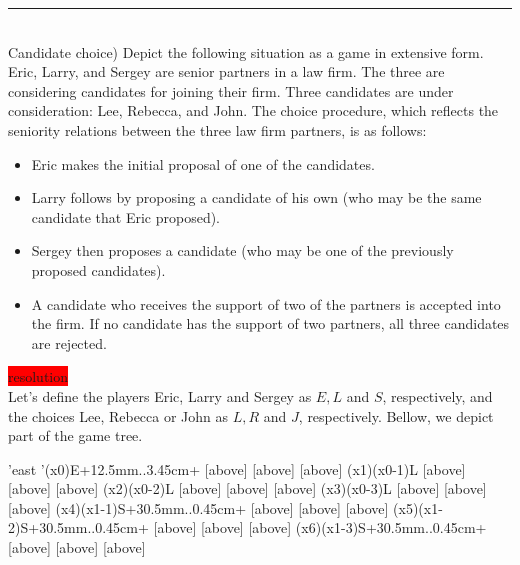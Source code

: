 \documentclass[10pt]{report}
\newenvironment{exercise}[1]
    {\vspace{0.5cm}\hrule\vspace{0.5cm}\noindent\fbox{#1}\\}
    {\vspace{0.5cm}}
\newenvironment{response}
{\vspace{0.2cm}\noindent\colorbox{red}{resolution}}
    {\vspace{0.5cm}}
\begin{document}
\begin{exercise}{3.2}
	(Candidate choice) Depict the following situation as a game in extensive form. Eric, Larry, and Sergey are senior partners in a law firm. The three are considering candidates for joining their firm. Three candidates are under consideration: Lee, Rebecca, and John. The choice procedure, which reflects the seniority relations between the three law firm partners, is as follows:
	\begin{itemize}
		\item Eric makes the initial proposal of one of the candidates.
		\item Larry follows by proposing a candidate of his own (who may be the same candidate that Eric proposed).
		\item Sergey then proposes a candidate (who may be one of the previously proposed candidates).
		\item A candidate who receives the support of two of the partners is accepted into the firm. If no candidate has the support of two partners, all three candidates are rejected.
	\end{itemize}
	\begin{response}\\
		Let's define the players Eric, Larry and Sergey as $ E, L $ and $ S $, respectively, and the choices Lee, Rebecca or John as $ L,R $ and $ J $, respectively. Bellow, we depict part of the game tree.\\
		\vspace{0.5cm}

		\begin{istgame}[sloped,font=\tiny]
			\setistgrowdirection'{east}
			\setistOvalNodeStyle{.6cm}
			\istrooto'(x0){E}+{12.5mm}..{3.45cm}+
			[above] [above] [above] \endist
			\xtShowEndPoints[oval node, minimum size=6pt]
			\xtdistance{52.5mm}{11.5mm}
			\istrooto(x1)(x0-1){L}
			[above]
			[above]
			[above]
			\endist
			\istrooto(x2)(x0-2){L}
			[above]
			[above]
			[above]
			\endist
			\istrooto(x3)(x0-3){L}
			[above]
			[above]
			[above]
			\endist
			\istrooto(x4)(x1-1){S}+{30.5mm}..{0.45cm}+
			[above]{}
			[above]{}
			[above]{}
			\endist
			\istrooto(x5)(x1-2){S}+{30.5mm}..{0.45cm}+
			[above]{}
			[above]{}
			[above]{}
			\endist
			\istrooto(x6)(x1-3){S}+{30.5mm}..{0.45cm}+
			[above]{}
			[above]{}
			[above]{}
			\endist
		\end{istgame}

	\end{response}
\end{exercise}
\end{document}
